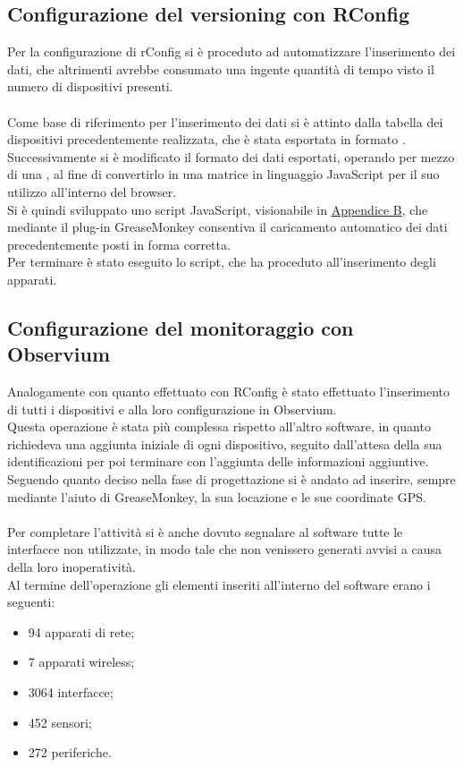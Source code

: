 \documentclass[Realizzazione.tex]{subfiles}
\begin{document}
\subsection{Configurazione del versioning con RConfig}
Per la configurazione di rConfig si è proceduto ad automatizzare l'inserimento dei dati, che altrimenti avrebbe consumato una ingente quantità di tempo visto il numero di dispositivi presenti. \\\\
Come base di riferimento per l'inserimento dei dati si è attinto dalla tabella dei dispositivi precedentemente realizzata, che è stata esportata in formato .\\
Successivamente si è modificato il formato dei dati esportati, operando per mezzo di una , al fine di convertirlo in una matrice in linguaggio JavaScript per il suo utilizzo all'interno del browser. \\
Si è quindi sviluppato uno script JavaScript, visionabile in \hyperref[sec:Appendice B]{Appendice B}, che mediante il plug-in GreaseMonkey consentiva il caricamento automatico dei dati precedentemente posti in forma corretta. \\
Per terminare è stato eseguito lo script, che ha proceduto all'inserimento degli apparati. \\

\subsection{Configurazione del monitoraggio con Observium}
Analogamente con quanto effettuato con RConfig è stato effettuato l'inserimento di tutti i dispositivi e alla loro configurazione in Observium. \\
Questa operazione è stata più complessa rispetto all'altro software, in quanto richiedeva una aggiunta iniziale di ogni dispositivo, seguito dall'attesa della sua identificazioni per poi terminare con l'aggiunta delle informazioni aggiuntive. Seguendo quanto deciso nella fase di progettazione si è andato ad inserire, sempre mediante l'aiuto di GreaseMonkey, la sua locazione e le sue coordinate GPS. \\\\
Per completare l'attività si è anche dovuto segnalare al software tutte le interfacce non utilizzate, in modo tale che non venissero generati avvisi a causa della loro inoperatività.\\

Al termine dell'operazione gli elementi inseriti all'interno del software erano i seguenti:
\begin{itemize}
	\item 94 apparati di rete;
	\item 7 apparati wireless;
	\item 3064 interfacce;
	\item 452 sensori;
	\item 272 periferiche.
\end{itemize}
\end{document}
